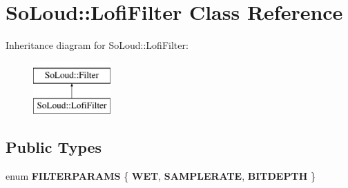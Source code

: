 \hypertarget{class_so_loud_1_1_lofi_filter}{}\section{So\+Loud\+::Lofi\+Filter Class Reference}
\label{class_so_loud_1_1_lofi_filter}
Inheritance diagram for So\+Loud\+::Lofi\+Filter\+:\begin{figure}[H]
\begin{center}
\leavevmode
\includegraphics[height=2.000000cm]{class_so_loud_1_1_lofi_filter}
\end{center}
\end{figure}
\subsection*{Public Types}
\begin{DoxyCompactItemize}
\item 
\mbox{\label{class_so_loud_1_1_lofi_filter_a628a6ed55f2e6b27b656c84deb1bf242}} 
enum {\bfseries F\+I\+L\+T\+E\+R\+P\+A\+R\+A\+MS} \{ {\bfseries W\+ET}, 
{\bfseries S\+A\+M\+P\+L\+E\+R\+A\+TE}, 
{\bfseries B\+I\+T\+D\+E\+P\+TH}
 \}
\end{DoxyCompactItemize}
